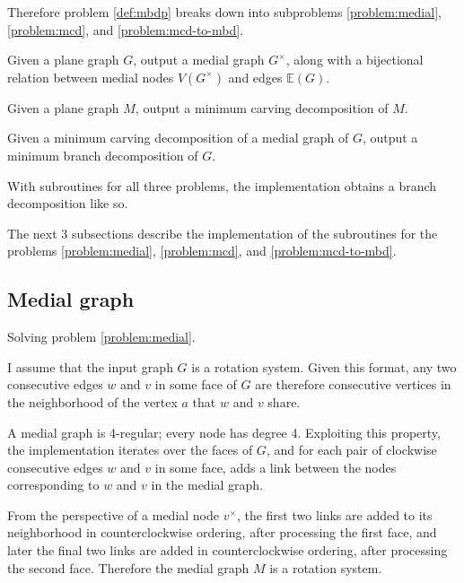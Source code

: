 \documentclass{article}
\begin{document}
	Therefore problem \ref{def:mbdp} breaks down into subproblems \ref{problem:medial}, \ref{problem:mcd}, and \ref{problem:mcd-to-mbd}.

	\begin{problem}\label{problem:medial}
		Given a plane graph $G$, output a medial graph $G^\times$, along with a bijectional relation between medial nodes $V(G^\times)$ and edges $\mathbb{E}(G)$.
	\end{problem}

	\begin{problem}\label{problem:mcd}
		Given a plane graph $M$, output a minimum carving decomposition of $M$.
	\end{problem}

	\begin{problem}\label{problem:mcd-to-mbd}
		Given a minimum carving decomposition of a medial graph of $G$, output a minimum branch decomposition of $G$.
	\end{problem}

	With subroutines for all three problems, the implementation obtains a branch decomposition like so.


	The next 3 subsections describe the implementation of the subroutines for the problems \ref{problem:medial}, \ref{problem:mcd}, and \ref{problem:mcd-to-mbd}.

	\subsection{Medial graph}

		Solving problem \ref{problem:medial}.

		I assume that the input graph $G$ is a rotation system. Given this format, any two consecutive edges $w$ and $v$ in some face of $G$ are therefore consecutive vertices in the neighborhood of the vertex $a$ that $w$ and $v$ share.

		A medial graph is 4-regular; every node has degree 4. Exploiting this property, the implementation iterates over the faces of $G$, and for each pair of clockwise consecutive edges $w$ and $v$ in some face, adds a link between the nodes corresponding to $w$ and $v$ in the medial graph.
		
		From the perspective of a medial node $v^\times$, the first two links are added to its neighborhood in counterclockwise ordering, after processing the first face, and later the final two links are added in counterclockwise ordering, after processing the second face. Therefore the medial graph $M$ is a rotation system.
\end{document}
